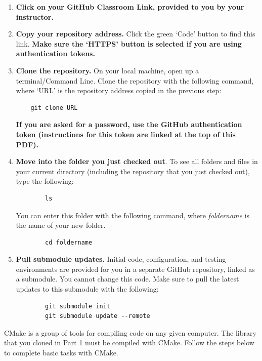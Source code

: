 \documentclass{article} %
\begin{document}
\begin{enumerate} 
    \item \textbf{Click on your GitHub Classroom Link, provided to you by your instructor.}
    
    \item \textbf{Copy your repository address.} Click the green `Code' button to find this link.  \textbf{Make sure the `HTTPS' button is selected if you are using authentication tokens.}    
    
    \item \textbf{Clone the repository.}  On your local machine, open up a terminal/Command Line.  Clone the repository with the following command, where `URL' is the repository address copied in the previous step:
    \begin{verbatim}
    git clone URL
    \end{verbatim}
    \textbf{If you are asked for a password, use the GitHub authentication token (instructions for this token are linked at the top of this PDF).}
    

    \item \textbf{Move into the folder you just checked out}.  To see all folders and files in your current directory (including the repository that you just checked out), type the following:
    \begin{verbatim}
        ls
    \end{verbatim}
    You can enter this folder with the following command, where \emph{foldername} is the name of your new folder.
    \begin{verbatim}
        cd foldername
    \end{verbatim}
    
    \item \textbf{Pull submodule updates.}  Initial code, configuration, and testing environments are provided for you in a separate GitHub repository, linked as a submodule.  You cannot change this code.  Make sure to pull the latest updates to this submodule with the following:
    \begin{verbatim}
        git submodule init
        git submodule update --remote
    \end{verbatim}
\end{enumerate}

CMake is a group of tools for compiling code on any given computer.  The library that you cloned in Part 1 must be compiled with CMake.  Follow the steps below to complete basic tasks with CMake.
\end{document}

